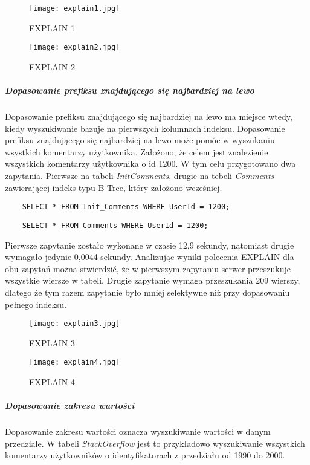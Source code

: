 \begin{figure}[h]
    \texttt{[image: explain1.jpg]} 
    \caption{EXPLAIN 1}
    \label{fig::explain1.jpg}
\end{figure}

\begin{figure}[h]
    \texttt{[image: explain2.jpg]} 
    \caption{EXPLAIN 2}
    \label{fig::explain2.jpg}
\end{figure}


\subparagraph{Dopasowanie prefiksu znajdującego się najbardziej na lewo}\mbox{} \newline
Dopasowanie prefiksu znajdującego się najbardziej na lewo ma miejsce wtedy, kiedy wyszukiwanie bazuje na pierwszych kolumnach indeksu.
Dopasowanie prefiksu znajdującego się najbardziej na lewo może pomóc w wyszukaniu wsystkich komentarzy użytkownika. Założono, że celem jest znalezienie wszystkich komentarzy użytkownika o id 1200.
W tym celu przygotowano dwa zapytania. Pierwsze na tabeli \textit{Init\textunderscore Comments}, drugie na tebeli \textit{Comments} zawierającej indeks typu B-Tree, który założono wcześniej.
\begin{verbatim}
    SELECT * FROM Init_Comments WHERE UserId = 1200;
\end{verbatim}
\begin{verbatim}
    SELECT * FROM Comments WHERE UserId = 1200;
\end{verbatim}
Pierwsze zapytanie zostało wykonane w czasie 12,9 sekundy, natomiast drugie wymagało jedynie 0,0044 sekundy. Analizując wyniki polecenia EXPLAIN dla obu zapytań można stwierdzić, że w pierwszym zapytaniu serwer przeszukuje wszystkie wiersze w tabeli. Drugie zapytanie wymaga przeszukania 209 wierszy, dlatego że tym razem zapytanie było mniej selektywne niż przy dopasowaniu pełnego indeksu.
\begin{figure}[h]
    \texttt{[image: explain3.jpg]} 
    \caption{EXPLAIN 3}
\end{figure}

\begin{figure}[h]
    \texttt{[image: explain4.jpg]} 
    \caption{EXPLAIN 4}
\end{figure}

\subparagraph{Dopasowanie zakresu wartości}\mbox{} \newline
Dopasowanie zakresu wartości oznacza wyszukiwanie wartości w danym przedziale. W tabeli \textit{StackOverflow} jest to przykładowo wyszukiwanie wszystkich komentarzy użytkowników o identyfikatorach z przedziału od 1990 do 2000.

